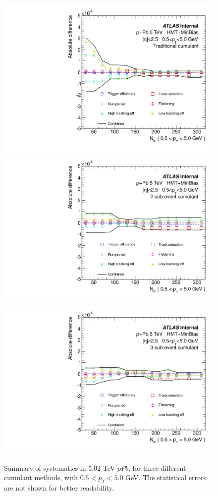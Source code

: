 \begin{figure}[H]
\centering
\includegraphics[width=0.3\linewidth]{figs/sec_sys/pPb5/sys_pPb5_NNNN_Har0_Pt1_Cls0.pdf}
\includegraphics[width=0.3\linewidth]{figs/sec_sys/pPb5/sys_pPb5_ABAB_Har0_Pt1_Cls0.pdf}
\includegraphics[width=0.3\linewidth]{figs/sec_sys/pPb5/sys_pPb5_ABAC_Har0_Pt1_Cls0.pdf}
\caption{Summary of systematics in 5.02 TeV $pPb$, for three different cumulant methods, with $0.5<p_{T}<5.0$ GeV. The statistical errors are not shown for better readability.}
\label{fig:sys_pPb5_sum_pt1}
\end{figure}







